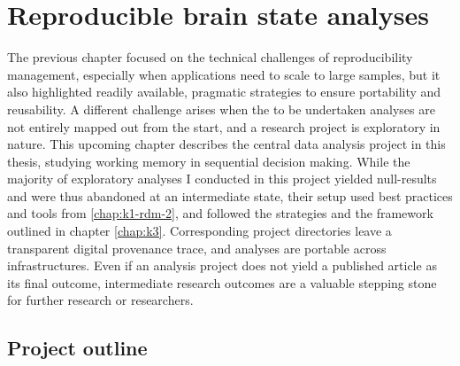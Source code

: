 

\chapter{Reproducible brain state analyses}
\label{chap:k4}

The previous chapter focused on the technical challenges of reproducibility management, especially when applications need to scale to large samples, but it also highlighted readily available, pragmatic strategies to ensure portability and reusability.
A different challenge arises when the to be undertaken analyses are not entirely mapped out from the start, and a research project is exploratory in nature.
This upcoming chapter describes the central data analysis project in this thesis, studying working memory in sequential decision making.
While the majority of exploratory analyses I conducted in this project yielded null-results and were thus abandoned at an intermediate state, their setup used best practices and tools from \ref{chap:k1-rdm-2}, and followed the strategies and the framework outlined in chapter \ref{chap:k3}.
Corresponding project directories leave a transparent digital provenance trace, and analyses are portable across infrastructures.
Even if an analysis project does not yield a published article as its final outcome, intermediate research outcomes are a valuable stepping stone for further research or researchers.

\section{Project outline}

